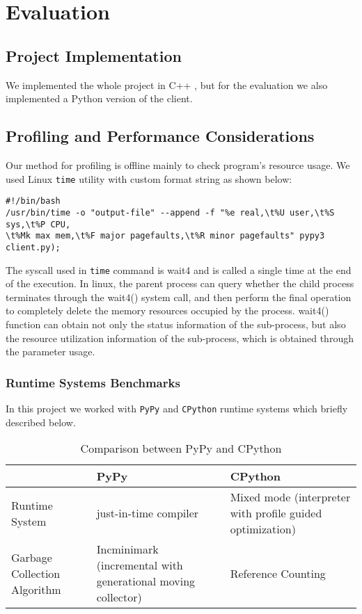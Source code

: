 \section{Evaluation}
\label{sec:Eval}

\subsection{Project Implementation}
We implemented the whole project in C++ \cite{prj_git}, but for the evaluation we also implemented a Python version of the client. 
\subsection{Profiling and Performance Considerations}
Our method for profiling is offline mainly to check program's resource usage. We used Linux \texttt{time} utility with custom format string as shown below:
\begin{lstlisting}
#!/bin/bash
/usr/bin/time -o "output-file" --append -f "%e real,\t%U user,\t%S sys,\t%P CPU,
\t%Mk max mem,\t%F major pagefaults,\t%R minor pagefaults" pypy3 client.py);
\end{lstlisting}

The syscall used in \texttt{time} command is wait4 and is called a single time at the end of the execution. In linux, the parent process can query whether the child process terminates through the wait4() system call, and then perform the final operation to completely delete the memory resources occupied by the process. wait4() function can obtain not only the status information of the sub-process, but also the resource utilization information of the sub-process, which is obtained through the parameter usage. 

\subsubsection{Runtime Systems Benchmarks}
In this project we worked with \texttt{PyPy} and \texttt{CPython} runtime systems which briefly described below.
\begin{center}
\begin{table}[h]
 \caption{Comparison between PyPy and CPython}
\begin{tabular}{ | l | p{5cm} |p{5cm} |} 
 \hline
  & PyPy  & CPython  \\ 
  \hline
  Runtime System & just-in-time compiler & Mixed mode (interpreter with profile guided optimization)  \\ 
  \hline
 Garbage Collection Algorithm & Incminimark (incremental with generational moving collector) & Reference Counting \\ 
 \hline
\end{tabular}
\end{table}
\end{center}

